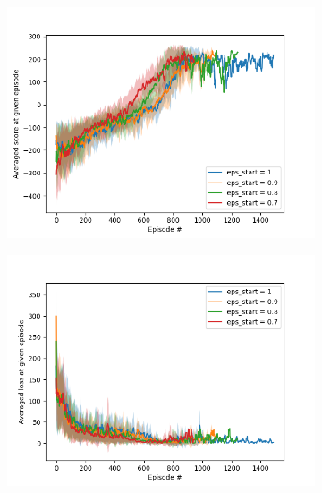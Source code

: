 \documentclass{article}
\begin{document}
\newpage
\begin{figure}[H]
    \begin{subfigure}{0.5\linewidth}
        \centering
        \includegraphics[width=\linewidth]{figs/EPS_START.png}
    \end{subfigure}
    \quad
    \begin{subfigure}{0.5\linewidth}
        \centering
        \includegraphics[width=\linewidth]{figs/EPS_START(loss).png}
    \end{subfigure}
    \begin{subfigure}{0.5\linewidth}
        \centering

\end{subfigure}
\end{figure}
\end{document}
